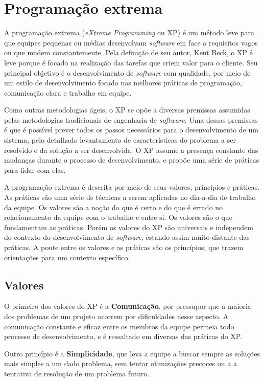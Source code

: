 \documentclass[a4paper,12pt,font=plain,header=plain]{abnt}
\begin{document}
	\chapter{Programação extrema}
	A programação extrema (\textit{eXtreme Programming} ou XP) é um método leve para que equipes pequenas ou médias desenvolvam \textit{software} em face a requisitos vagos ou que mudem constantemente\cite{beck04}. Pela definição de seu autor, Kent Beck, o XP é leve porque é focado na realização das tarefas que criem valor para o cliente. Seu principal objetivo é o desenvolvimento de \textit{software} com qualidade, por meio de um estilo de desenvolvimento focado nas melhores práticas de programação, comunicação clara e trabalho em equipe.
	
	Como outras metodologias ágeis, o XP se opõe a diversas premissas assumidas pelas metodologias tradicionais de engenharia de \textit{software}. Uma dessas premissas é que é possível prever todos os passos necessários para o desenvolvimento de um sistema, pelo detalhado levantamento de características do problema a ser resolvido e da solução a ser desenvolvida. O XP assume a presença constante das mudanças durante o processo de desenvolvimento, e propõe uma série de práticas para lidar com elas.
	
	A programação extrema é descrita por meio de seus valores, princípios e práticas. As práticas são uma série de técnicas a serem aplicadas no dia-a-dia de trabalho da equipe. Os valores são a noção do que é certo e do que é errado no relacionamento da equipe com o trabalho e entre si. Os valores são o que fundamentam as práticas. Porém os valores do XP são universais e independem do contexto do desenvolvimento de \textit{software}, estando assim muito distante das práticas. A ponte entre os valores e as práticas são os princípios, que trazem orientações para um contexto específico.
	
	\section{Valores}
	
	O primeiro dos valores do XP é a \textbf{Comunicação}, por pressupor que a maioria dos problemas de um projeto ocorrem por dificuldades nesse aspecto. A comunicação constante e eficaz entre os membros da equipe permeia todo processo de desenvolvimento, e é ressaltado em diversas das práticas do XP.
	
	Outro princípio é a \textbf{Simplicidade}, que leva a equipe a buscar sempre as soluções mais simples a um dado problema, sem tentar otimizações precoces ou a a tentativa de resolução de um problema futuro.
	
\end{document}
